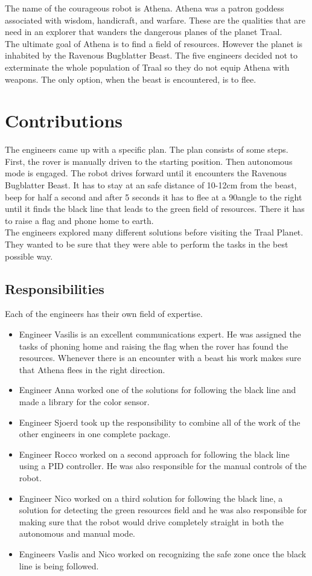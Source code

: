 \documentclass[a4paper,12pt]{article}
\begin{document}
\noindent The name of the courageous robot is Athena. Athena was a patron goddess associated with wisdom, handicraft, and warfare. These are the qualities that are need in an explorer that wanders the dangerous planes of the planet Traal.\\

\noindent The ultimate goal of Athena is to find a field of resources. However the planet is inhabited by the Ravenous Bugblatter Beast. The five engineers decided not to exterminate the whole population of Traal so they do not equip Athena with weapons. The only option, when the beast is encountered, is to flee.

\section{Contributions}
The engineers came up with a specific plan. The plan consists of some steps. First, the rover is manually driven to the starting position. Then autonomous mode is engaged. The robot drives forward until it encounters the Ravenous Bugblatter Beast. It has to stay at an safe distance of 10-12cm from the beast, beep for half a second and after 5 seconds it has to flee at a 90\degree angle to the right until it finds the black line that leads to the green field of resources. There it has to raise a flag and phone home to earth.\\

\noindent The engineers explored many different solutions before visiting the Traal Planet. They wanted to be sure that they were able to perform the tasks in the best possible way.
\subsection{Responsibilities}
Each of the engineers has their own field of expertise.\\
\begin{itemize}
    \item Engineer Vasilis is an excellent communications expert. He was assigned the tasks of phoning home and raising the flag when the rover has found the resources. Whenever there is an encounter with a beast his work makes sure that Athena flees in the right direction.
    \item Engineer Anna worked one of the solutions for following the black line and made a library for the color sensor.
    \item Engineer Sjoerd took up the responsibility to combine all of the work of the other engineers in one complete package.
    \item Engineer Rocco worked on a second approach for following the black line using a PID controller. He was also responsible for the manual controls of the robot.
    \item Engineer Nico worked on a third solution for following the black line, a solution for detecting the green resources field and he was also responsible for making sure that the robot would drive completely straight in both the autonomous and manual mode.
    \item Engineers Vaslis and Nico worked on recognizing the safe zone once the black line is being followed.
\end{itemize}
\end{document}
